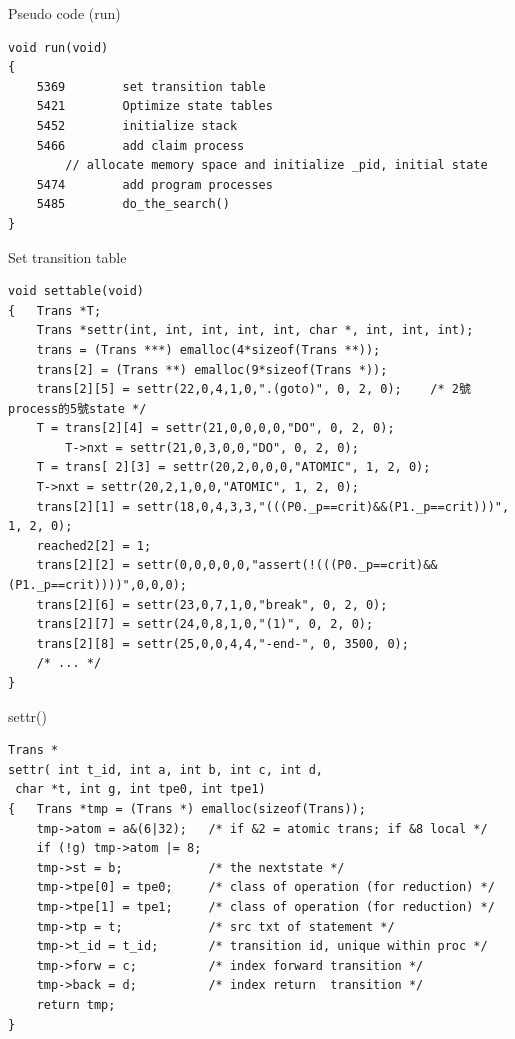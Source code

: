 \documentclass[12pt]{beamer}
\begin{document}
\begin{frame}[fragile]{Pseudo code (run)}
\begin{lstlisting}[basicstyle=\normalsize]
void run(void)
{
    5369        set transition table
    5421        Optimize state tables
    5452        initialize stack
    5466        add claim process  
        // allocate memory space and initialize _pid, initial state
    5474        add program processes   
    5485        do_the_search()
}
\end{lstlisting}
\end{frame}

\begin{frame}[fragile]{Set transition table}
\begin{lstlisting}[basicstyle=\scriptsize]
void settable(void)
{   Trans *T;
    Trans *settr(int, int, int, int, int, char *, int, int, int);
    trans = (Trans ***) emalloc(4*sizeof(Trans **));
    trans[2] = (Trans **) emalloc(9*sizeof(Trans *));
    trans[2][5] = settr(22,0,4,1,0,".(goto)", 0, 2, 0);    /* 2號process的5號state */
    T = trans[2][4] = settr(21,0,0,0,0,"DO", 0, 2, 0);
        T->nxt = settr(21,0,3,0,0,"DO", 0, 2, 0);
    T = trans[ 2][3] = settr(20,2,0,0,0,"ATOMIC", 1, 2, 0);
    T->nxt = settr(20,2,1,0,0,"ATOMIC", 1, 2, 0);
    trans[2][1] = settr(18,0,4,3,3,"(((P0._p==crit)&&(P1._p==crit)))", 1, 2, 0);
    reached2[2] = 1;
    trans[2][2] = settr(0,0,0,0,0,"assert(!(((P0._p==crit)&&(P1._p==crit))))",0,0,0);
    trans[2][6] = settr(23,0,7,1,0,"break", 0, 2, 0);
    trans[2][7] = settr(24,0,8,1,0,"(1)", 0, 2, 0);
    trans[2][8] = settr(25,0,0,4,4,"-end-", 0, 3500, 0);
    /* ... */
}
\end{lstlisting}
\end{frame}
    
\begin{frame}[fragile]{settr()}
\begin{lstlisting}[basicstyle=\footnotesize]
Trans *
settr( int t_id, int a, int b, int c, int d,
 char *t, int g, int tpe0, int tpe1)
{   Trans *tmp = (Trans *) emalloc(sizeof(Trans));    
    tmp->atom = a&(6|32);   /* if &2 = atomic trans; if &8 local */
    if (!g) tmp->atom |= 8;
    tmp->st = b;            /* the nextstate */
    tmp->tpe[0] = tpe0;     /* class of operation (for reduction) */
    tmp->tpe[1] = tpe1;     /* class of operation (for reduction) */
    tmp->tp = t;            /* src txt of statement */
    tmp->t_id = t_id;       /* transition id, unique within proc */
    tmp->forw = c;          /* index forward transition */
    tmp->back = d;          /* index return  transition */
    return tmp;
}
\end{lstlisting}
\end{frame}
\end{document}
